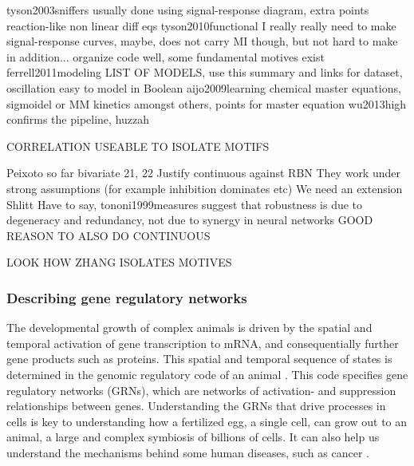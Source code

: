\documentclass[../main.tex]{subfiles}
\begin{document}
tyson2003sniffers usually done using signal-response diagram, extra points reaction-like non linear diff eqs
tyson2010functional I really really need to make signal-response curves, maybe, does not carry MI though, but not hard to make in addition... organize code well, some fundamental motives exist
ferrell2011modeling LIST OF MODELS, use this summary and links for dataset, oscillation easy to model in Boolean
aijo2009learning chemical master equations, sigmoidel or MM kinetics amongst others, points for master equation
wu2013high confirms the pipeline, huzzah

CORRELATION
USEABLE TO ISOLATE MOTIFS

Peixoto so far
bivariate 21, 22
Justify continuous against RBN
They work under strong assumptions (for example inhibition dominates etc) \cite{}
We need an extension
Shlitt
Have to say, tononi1999measures suggest that robustness is due to degeneracy and redundancy, not due to synergy in neural networks
GOOD REASON TO ALSO DO CONTINUOUS

LOOK HOW ZHANG ISOLATES MOTIVES

\subsubsection{Describing gene regulatory networks}

The developmental growth of complex animals is driven by the spatial and temporal activation of gene transcription to mRNA, and consequentially further gene products such as proteins.
This spatial and temporal sequence of states is determined in the genomic regulatory code of an animal \cite{bolouri2002modeling, kuhn2009monte}.
This code specifies gene regulatory networks (GRNs), which are networks of activation- and suppression relationships between genes.
Understanding the GRNs that drive processes in cells is key to understanding how a fertilized egg, a single cell, can grow out to an animal, a large and complex symbiosis of billions of cells.
It can also help us understand the mechanisms behind some human diseases, such as cancer \cite{qian2008inference}.
\end{document}
